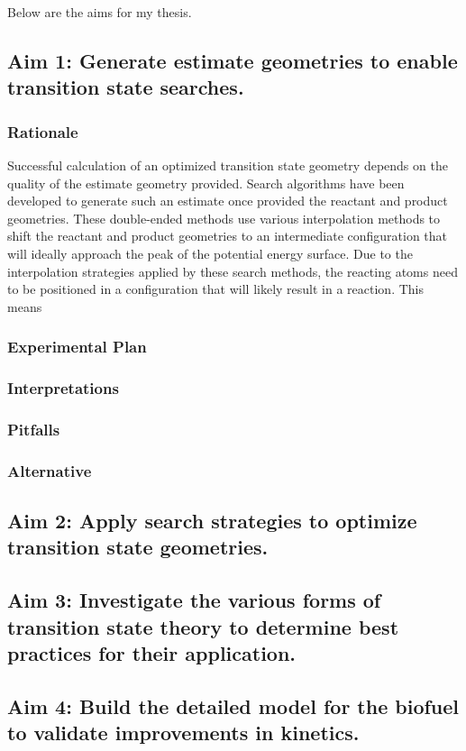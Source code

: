 \documentclass[12pt]{article}
\begin{document}
Below are the aims for my thesis.

\subsection{Aim 1: Generate estimate geometries to enable transition state searches.}
\subsubsection{Rationale}

Successful calculation of an optimized transition state geometry depends on the quality of the estimate geometry provided. Search algorithms have been developed to generate such an estimate once provided the reactant and product geometries. These double-ended methods use various interpolation methods to shift the reactant and product geometries to an intermediate configuration that will ideally approach the peak of the potential energy surface. Due to the interpolation strategies applied by these search methods, the reacting atoms need to be positioned in a configuration that will likely result in a reaction. This means 

\subsubsection{Experimental Plan}
\subsubsection{Interpretations}
\subsubsection{Pitfalls}
\subsubsection{Alternative}

\subsection{Aim 2: Apply search strategies to optimize transition state geometries.}
\subsection{Aim 3: Investigate the various forms of transition state theory to determine best practices for their application.}
\subsection{Aim 4: Build the detailed model for the biofuel to validate improvements in kinetics.}
\end{document}
